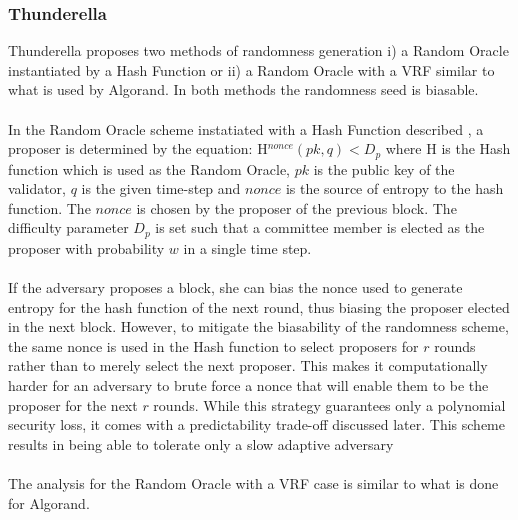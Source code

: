 \documentclass[10pt,journal,compsoc]{IEEEtran}
\begin{document}
\subsubsection{Thunderella}
Thunderella proposes two methods of randomness generation i) a Random Oracle instantiated by a Hash Function or ii) a Random Oracle with a VRF similar to what is used by Algorand. In both methods the randomness seed is biasable.
\\\\
In the Random Oracle scheme instatiated with a Hash Function described \cite{SnowWhite}, a proposer is determined by the equation: H$^{nonce}(pk, q) < D_p$ where H is the Hash function which is used as the Random Oracle, $pk$ is the public key of the validator, $q$ is the given time-step and $nonce$ is the source of entropy to the hash function. The $nonce$ is chosen by the proposer of the previous block. The difficulty parameter $D_p$ is set such that a committee member is elected as the proposer with probability $w$ in a single time step. 
\\\\
If the adversary proposes a block, she can bias the nonce used to generate entropy for the hash function of the next round, thus biasing the proposer elected in the next block. However, to mitigate the biasability of the randomness scheme, the same nonce is used in the Hash function to select proposers for $r$ rounds rather than to merely select the next proposer. This makes it computationally harder for an adversary to brute force a nonce that will enable them to be the proposer for the next $r$ rounds. While this strategy guarantees only a polynomial security loss, it comes with a predictability trade-off discussed later. This scheme results in being able to tolerate only a slow adaptive adversary
\\\\
The analysis for the Random Oracle with a VRF case is similar to what is done for Algorand. 
\end{document}
